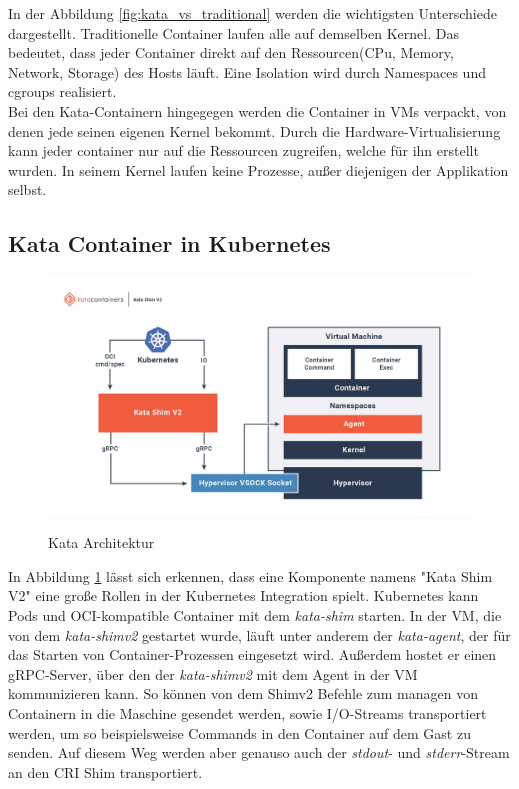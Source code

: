 In der Abbildung \ref{fig:kata_vs_traditional} werden die wichtigsten Unterschiede dargestellt.
Traditionelle Container laufen alle auf demselben Kernel. 
Das bedeutet, dass jeder Container direkt auf den Ressourcen(CPu, Memory, Network, Storage) des Hosts läuft. 
Eine Isolation wird durch Namespaces und cgroups realisiert.
\\
Bei den Kata-Containern hingegegen werden die Container in \ac{VM}s verpackt, von denen jede seinen eigenen Kernel bekommt.
Durch die Hardware-Virtualisierung kann jeder container nur auf die Ressourcen zugreifen, welche für ihn erstellt wurden. 
In seinem Kernel laufen keine Prozesse, außer diejenigen der Applikation selbst.  

\subsection{Kata Container in Kubernetes}

\begin{figure}[h]
        \caption{Kata Architektur\cite{kata_learn}}
        \centering
        \includegraphics[width=\textwidth]{bilder/katacontainers_architecture_diagram.jpg}
        \label{fig:kata_architecture}
\end{figure}

In Abbildung \ref{fig:kata_architecture} lässt sich erkennen, dass eine Komponente namens "Kata Shim V2" eine große Rollen in der Kubernetes Integration spielt.
Kubernetes kann Pods und \ac{OCI}-kompatible Container mit dem \textit{kata-shim} starten. 
In der \ac{VM}, die von dem \textit{kata-shimv2} gestartet wurde, läuft unter anderem der \textit{kata-agent}, der für das Starten von Container-Prozessen eingesetzt wird.
Außerdem hostet er einen \ac{gRPC}-Server, über den der \textit{kata-shimv2} mit dem Agent in der \ac{VM} kommunizieren kann.
So können von dem Shimv2 Befehle zum managen von Containern in die Maschine gesendet werden, sowie \ac{I/O}-Streams transportiert werden, um so beispielsweise Commands in den Container auf dem Gast zu senden.
Auf diesem Weg werden aber genauso auch der \textit{stdout}- und \textit{stderr}-Stream an den \ac{CRI} Shim transportiert.
\cite{kata_architecture}



